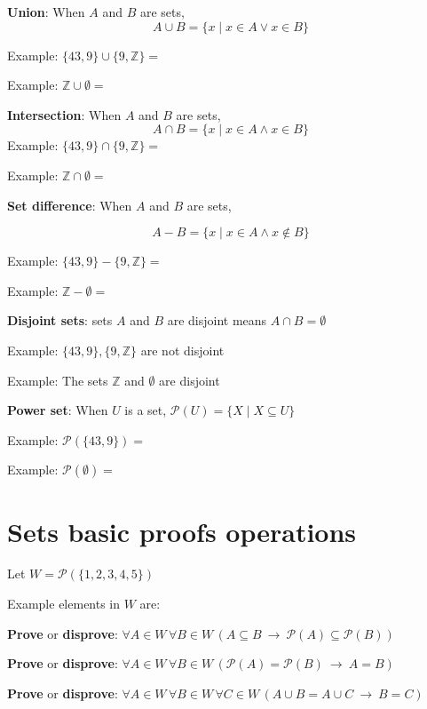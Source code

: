 \documentclass[12pt, oneside]{article}
\begin{document}
{\bf Union}: When $A$ and  $B$ are sets,
\[
    A \cup  B = \{ x \mid x \in A  \vee x \in B \}
\]    
    
Example: $\{43, 9\} \cup \{9, \mathbb{Z}\}  = $

Example: $\mathbb{Z} \cup \emptyset  = $ 

{\bf Intersection}: When $A$ and  $B$ are sets,
\[
    A \cap  B = \{ x \mid x \in A  \wedge x \in B \}
\]    
Example: $\{43, 9\} \cap \{9,\mathbb{Z}\}  = $

Example: $\mathbb{Z} \cap \emptyset  = $


{\bf Set  difference}: When $A$ and  $B$ are sets,

\[
    A -  B = \{ x \mid x \in A  \wedge x \notin B \}
\]

Example: $\{43, 9\} - \{9, \mathbb{Z}\}  = $

Example: $\mathbb{Z} - \emptyset  = $

    
{\bf Disjoint sets}: sets $A$ and  $B$ are disjoint means $A \cap  B  = \emptyset$

Example: $\{43, 9\}, \{9, \mathbb{Z}\}$ are not  disjoint 

Example: The sets $\mathbb{Z}$ and $\emptyset$ are disjoint

    

{\bf Power set}: When $U$ is a set, $\mathcal{P}(U) = \{ X \mid X \subseteq U\}$

Example: $\mathcal{P}(\{43, 9\}) = $

Example: $\mathcal{P}(\emptyset) = $
 \vfill
\section*{Sets basic proofs operations}


Let $W =  \mathcal{P}(  \{ 1,2,3,4,5\} )$

Example elements in $W$ are:
\vspace{20pt}


{\bf Prove} or {\bf  disprove}:  $\forall  A \in W\,  \forall B \in W\,  \left( A \subseteq B
~\to ~ \mathcal{P}(A) \subseteq \mathcal{P}(B) \right)$

\vfill
\vfill
\vfill

{\bf Prove} or {\bf  disprove}:  $\forall  A \in W\,  \forall B \in W\,  \left( \mathcal{P}(A)  =\mathcal{P}(B)
~\to ~ A = B \right)$

\vfill
\vfill

{\bf Prove} or {\bf  disprove}:  $\forall  A \in W\,  \forall B \in W\, \forall C  \in W\,  \left( A\cup B  = A \cup  C
~\to ~ B = C \right)$
\end{document}
